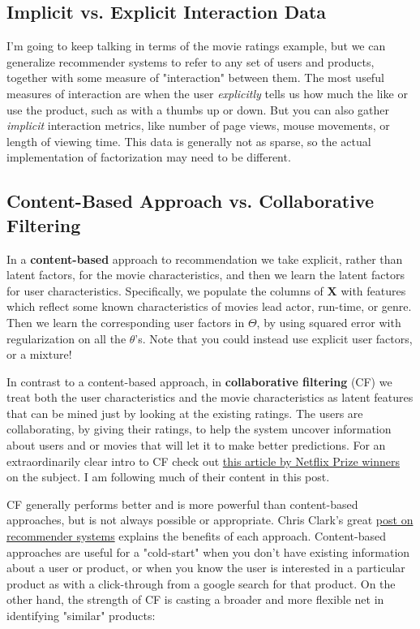 \documentclass[11pt]{article}
\begin{document}
    \subsection{Implicit vs. Explicit Interaction
Data}\label{implicit-vs.-explicit-interaction-data}

I'm going to keep talking in terms of the movie ratings example, but we
can generalize recommender systems to refer to any set of users and
products, together with some measure of "interaction" between them. The
most useful measures of interaction are when the user \emph{explicitly}
tells us how much the like or use the product, such as with a thumbs up
or down. But you can also gather \emph{implicit} interaction metrics,
like number of page views, mouse movements, or length of viewing time.
This data is generally not as sparse, so the actual implementation of
factorization may need to be different.

    \subsection{Content-Based Approach vs. Collaborative
Filtering}\label{content-based-approach-vs.-collaborative-filtering}

In a \textbf{content-based} approach to recommendation we take explicit,
rather than latent factors, for the movie characteristics, and then we
learn the latent factors for user characteristics. Specifically, we
populate the columns of \(\mathbf{X}\) with features which reflect some
known characteristics of movies lead actor, run-time, or genre. Then we
learn the corresponding user factors in \(\Theta\), by using squared
error with regularization on all the \(\theta\)'s. Note that you could
instead use explicit user factors, or a mixture!

In contrast to a content-based approach, in \textbf{collaborative
filtering} (CF) we treat both the user characteristics and the movie
characteristics as latent features that can be mined just by looking at
the existing ratings. The users are collaborating, by giving their
ratings, to help the system uncover information about users and or
movies that will let it to make better predictions. For an
extraordinarily clear intro to CF check out
\href{https://datajobs.com/data-science-repo/Recommender-Systems-\%5BNetflix\%5D.pdf}{this
article by Netflix Prize winners} on the subject. I am following much of
their content in this post.

CF generally performs better and is more powerful than content-based
approaches, but is not always possible or appropriate. Chris Clark's
great
\href{http://blog.untrod.com/2016/06/simple-similar-products-recommendation-engine-in-python.html}{post
on recommender systems} explains the benefits of each approach.
Content-based approaches are useful for a "cold-start" when you don't
have existing information about a user or product, or when you know the
user is interested in a particular product as with a click-through from
a google search for that product. On the other hand, the strength of CF
is casting a broader and more flexible net in identifying "similar"
products:
\end{document}
